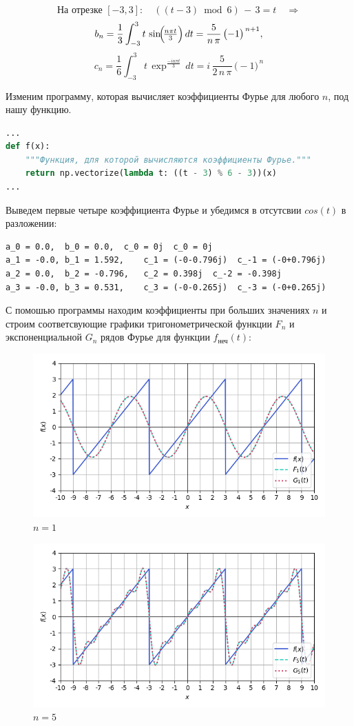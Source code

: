 \documentclass[a4paper]{article}
\begin{document}
\[
\text{На отрезке }[-3,3]:
\quad
((t-3)\bmod6)\,-\,3 = t \quad\Longrightarrow
\]
$$b_n=\frac{1}{3}\int_{-3}^{3}t\,\sin\!\Bigl(\!\tfrac{n\pi t}{3}\Bigr)\,dt = \frac{5}{n\,\pi}\,\bigl(-1\bigr)^{\,n+1},$$
$$c_n=\frac{1}{6}\int_{-3}^{3}t\,\exp^{\frac{-in\pi t}{3}}\,dt = i\,\frac{5}{2\,n\,\pi}\,\bigl(-1\bigr)^{\,n}$$


Изменим программу, которая вычисляет коэффициенты Фурье для любого $n$, под нашу функцию.
\begin{lstlisting}[language=Python, caption={Вычисление коэффициентов Фурье для функции $f_\text{неч}(t)$}]
...
def f(x):
    """Функция, для которой вычисляются коэффициенты Фурье."""
    return np.vectorize(lambda t: ((t - 3) % 6 - 3))(x)
...   
\end{lstlisting}
Выведем первые четыре коэффициента Фурье и убедимся в отсутсвии $cos(t)$ в разложении: 
\begin{lstlisting}[caption=Вывод программы]
a_0 = 0.0,	b_0 = 0.0,	c_0 = 0j  c_0 = 0j
a_1 = -0.0,	b_1 = 1.592,	c_1 = (-0-0.796j)  c_-1 = (-0+0.796j)
a_2 = 0.0,	b_2 = -0.796,	c_2 = 0.398j  c_-2 = -0.398j
a_3 = -0.0,	b_3 = 0.531,	c_3 = (-0-0.265j)  c_-3 = (-0+0.265j)
\end{lstlisting}
С помошью программы находим коэффициенты при больших значениях $n$ и строим соответсвующие графики тригонометрической функции $F_n$ и экспоненциальной $G_n$ рядов Фурье для функции $f_\text{неч}(t)$:
\begin{figure}[H]
    \centering
    \includegraphics[width=0.7\linewidth]{odd/Im1.png}
    \caption{$n = 1$}
\end{figure}
\begin{figure}[H]
    \centering
    \includegraphics[width=0.7\linewidth]{odd/Im5.png}
    \caption{$n = 5$}
\end{figure}
\end{document}
